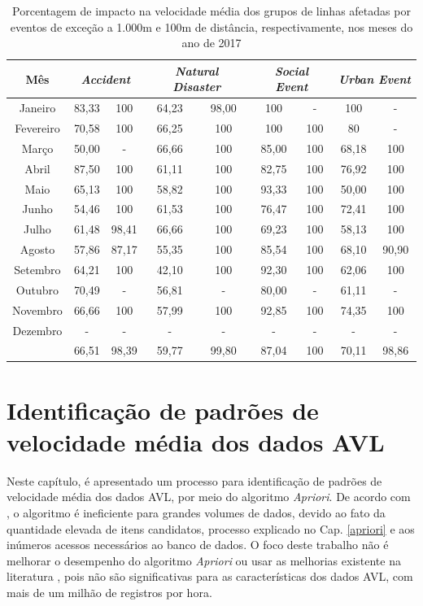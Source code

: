 \documentclass[
	12pt,				%
	oneside,			%
	a4paper,			%
	english,			%
	brazil				%
	]{abntex2ppgsi}
\begin{document}
\begin{table}[!htb]
\centering
\caption {Porcentagem de impacto na velocidade média dos grupos de linhas afetadas por eventos de exceção a 1.000m e 100m de distância, respectivamente, nos meses do ano de 2017}
\label {tab:exceptEventVelocityImpAll}
\begin{tabular}{c|cc|cc|cc|cc}
\toprule
\textbf{Mês} & \multicolumn{2}{c}{\textit{\textbf{Accident}}} & \multicolumn{2}{c}{\textit{\textbf{Natural Disaster}}} & \multicolumn{2}{c}{\textit{\textbf{Social Event}}} &
\multicolumn{2}{c}{\textit{\textbf{Urban Event}}}\\
\midrule
Janeiro & 83,33 &  100 & 
64,23 &  98,00 & 
100 & - &
 100 & - \\
\hline
Fevereiro & 70,58 &  100 &
 66,25 &  100 &
 100 & 100 &
 80 & - \\
\hline
Março &  50,00 &  - & 
66,66 &  100 &
85,00 & 100 &
68,18 & 100 \\
\hline
Abril & 87,50 &100 & 
 61,11 & 100 & 
 82,75 & 100 & 
 76,92 &  100 \\
\hline
Maio & 65,13 &  100 &
 58,82 &  100 &
 93,33 & 100 &
 50,00 & 100 \\
\hline
Junho & 54,46 &  100 &
 61,53 &  100 &
 76,47 & 100 &
 72,41 & 100 \\
\hline
Julho & 61,48 &  98,41 &
 66,66 & 100 &
 69,23 & 100 &
58,13 & 100 \\
\hline
Agosto & 57,86 & 87,17 &
 55,35 & 100 &
 85,54 & 100 & 
 68,10 & 90,90 \\
\hline
Setembro & 64,21 & 100 &
 42,10 & 100 &
 92,30 & 100 & 
 62,06 & 100 \\
\hline
Outubro & 70,49 & - &
 56,81 & - &
 80,00 & - &
 61,11 & - \\
\hline
Novembro & 66,66 & 100 &
 57,99 & 100 &
 92,85 & 100 &
 74,35 & 100 \\
\hline
Dezembro & - & - & - & - & - & - & - & -  \\
\midrule
{} & 66,51 & 98,39 & 59,77 & 99,80 & 87,04 & 100 & 70,11 & 98,86  \\
\bottomrule
\end{tabular}
\end{table}

\chapter{Identificação de padrões de velocidade média dos dados AVL}

Neste capítulo, é apresentado um processo para identificação de padrões de velocidade média dos dados AVL, por meio do algoritmo \textit{Apriori}. De acordo com \cite{xie2008optimization}, o algoritmo é ineficiente para grandes volumes de dados, devido ao fato da quantidade elevada de itens candidatos, processo explicado no Cap. \ref{apriori} e aos inúmeros acessos necessários ao banco de dados. O foco deste trabalho não é melhorar o desempenho do algoritmo \textit{Apriori} ou usar as melhorias existente na literatura \cite{xie2008optimization, zhang2014method}, pois não são significativas para as características dos dados AVL, com mais de um milhão de registros por hora.
\end{document}
